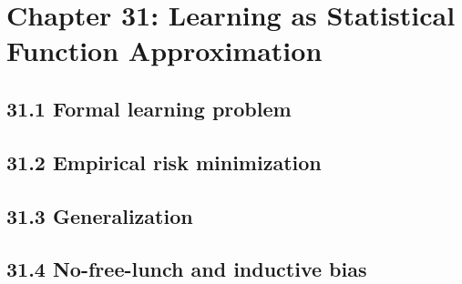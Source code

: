 \section{Chapter 31: Learning as Statistical Function Approximation}

\subsection{31.1 Formal learning problem}

\subsection{31.2 Empirical risk minimization}

\subsection{31.3 Generalization}

\subsection{31.4 No-free-lunch and inductive bias}

\clearpage
